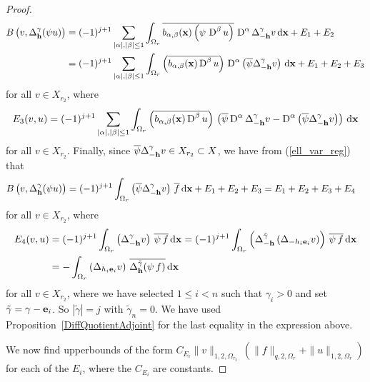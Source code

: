 \begin{proof}
\begin{align*}
B\left(v,\Delta_{\mathbf{h}}^\gamma(\psi u)\right)
&= (-1)^{j+1} \sum_{|\alpha|,|\beta|\leq 1}
\int_{\Omega_r}  \overline{ b_{\alpha,\beta}(\mathbf{x})
\left(\psi\, \operatorname{D}^\beta u\right)}
\, \operatorname{D}^\alpha \Delta_{-\mathbf{h}}^\gamma v \,\mathrm{d}{\mathbf{x}} + E_1 + E_2 \\
&= (-1)^{j+1} \sum_{|\alpha|,|\beta|\leq 1}
\int_{\Omega_r} \left(\overline{b_{\alpha,\beta}(\mathbf{x}) \operatorname{D}^\beta u} \right)
\, \operatorname{D}^\alpha \left( \overline{\psi} \Delta_{-\mathbf{h}}^\gamma v\right)
\,\mathrm{d}{\mathbf{x}} + E_1 + E_2 + E_3
\end{align*}
for all $v \in X_{r_2}$, where
\[
E_3(v,u) = (-1)^{j+1} \sum_{|\alpha|,|\beta|\leq 1}
\int_{\Omega_r} \left(\overline{b_{\alpha,\beta}(\mathbf{x}) \operatorname{D}^\beta u}\right) \,
\left(\overline{\psi} \operatorname{D}^\alpha \Delta_{-\mathbf{h}}^\gamma v -
\operatorname{D}^\alpha \left( \overline{\psi} \Delta_{-\mathbf{h}}^\gamma v\right)\right)
\,\mathrm{d}{\mathbf{x}}
\]
for all $v \in X_{r_2}$.  Finally, since
$\displaystyle \overline{\psi} \Delta_{-\mathbf{h}}^\gamma v \in X_{r_2} \subset X$,
we have from (\ref{ell_var_reg}) that
\begin{align*}
B\left(v,\Delta_{\mathbf{h}}^\gamma(\psi u)\right)
&= (-1)^{j+1} \int_{\Omega_r}
\left( \overline{\psi} \Delta_{-\mathbf{h}}^\gamma v\right)\,\overline{f}
\,\mathrm{d}{\mathbf{x}} +E_1 + E_2 + E_3 = E_1 + E_2 + E_3 + E_4
\end{align*}
for all $v \in X_{r_2}$, where
\begin{align*}
E_4(v,u) &= (-1)^{j+1} \int_{\Omega_r}
\left( \Delta_{-\mathbf{h}}^\gamma v \right)\,\overline{\psi\, f} \,\mathrm{d}{\mathbf{x}}
= (-1)^{j+1} \int_{\Omega_r}
\left( \Delta^{\tilde{\gamma}}_{-\mathbf{h}} \left(\Delta_{-h_i \mathbf{e}_i} v \right)
\right) \,\overline{\psi\, f} \,\mathrm{d}{\mathbf{x}} \\
&= - \int_{\Omega_r} \left(\Delta_{h_i \mathbf{e}_i} v \right)
\,\overline{\Delta^{\tilde{\gamma}}_{\mathbf{h}} (\psi\, f)} \,\mathrm{d}{\mathbf{x}}
\end{align*}
for all $v \in X_{r_2}$, where we have selected $1 \leq i < n$ such
that $\gamma_i >0$ and set $\tilde{\gamma} = \gamma - \mathbf{e}_i$.
So $|\tilde{\gamma}| = j$ with $\tilde{\gamma}_n = 0$.
We have used Proposition~\ref{DiffQuotientAdjoint} for the last
equality in the expression above.

We now find upperbounds of the form
$\displaystyle C_{E_i} \|v\|_{1,2,\Omega_{r_2}}\, \left( \|f\|_{q,2,\Omega_r}
+ \|u\|_{1,2,\Omega_r} \right)$ for each of the $E_i$, where the $C_{E_i}$
are constants.


\end{proof}
